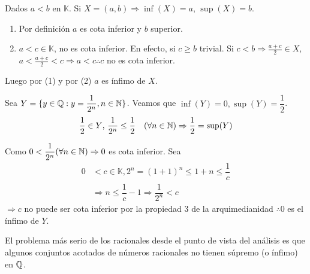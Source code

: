 \begin{eg}
    Dados \(a<b\) en \(\mathbb{K} \). Si \(X=(a,b) \Rightarrow \inf(X)=a\), \(\sup(X)=b\).
    \begin{enumerate}
        \item Por definición \(a\) es cota inferior y \(b\) superior.
        \item \(a < c \in \mathbb{K} \), no es cota inferior. En efecto, si \(c \geq b\) trivial. Si \(c < b \Rightarrow \frac{a+c}{2} \in X\),
              \(a < \frac{a+c}{2} < c \Rightarrow a < c \therefore c\) no es cota inferior.
    \end{enumerate}
    Luego por (1) y por (2) \(a\) es ínfimo de \(X\).
\end{eg}

\begin{eg}
    Sea \(Y = \{ y \in \mathbb{Q} : y=\dfrac{1}{2^n}, n\in \mathbb{N} \} \). Veamos que \(\inf(Y) =0, \sup(Y) = \dfrac{1}{2} \).
    \begin{align*}
        \dfrac{1}{2} \in Y \text{, } \dfrac{1}{2^n} \leq \dfrac{1}{2} \quad (\forall n \in \mathbb{N}) \Rightarrow \dfrac{1}{2} = \sup(Y)
    \end{align*}

    Como \(0 < \dfrac{1}{2^n} (\forall n \in \mathbb{N}) \Rightarrow 0\) es cota inferior.
    Sea \begin{align*}
        0 & < c \in \mathbb{K}, 2^n = (1+1)^n \leq 1+n \leq \dfrac{1}{c}       \\
          & \Rightarrow n \leq \dfrac{1}{c} - 1 \Rightarrow \dfrac{1}{2^n} < c
    \end{align*}
    \(\Rightarrow c\) no puede ser cota inferior por la propiedad 3 de la arquimedianidad \(\therefore 0\) es el ínfimo de \(Y\).
\end{eg}

El problema más serio de los racionales desde el punto de vista del análisis es que algunos conjuntos acotados de números racionales no tienen súpremo (o ínfimo) en \(\mathbb{Q} \).

